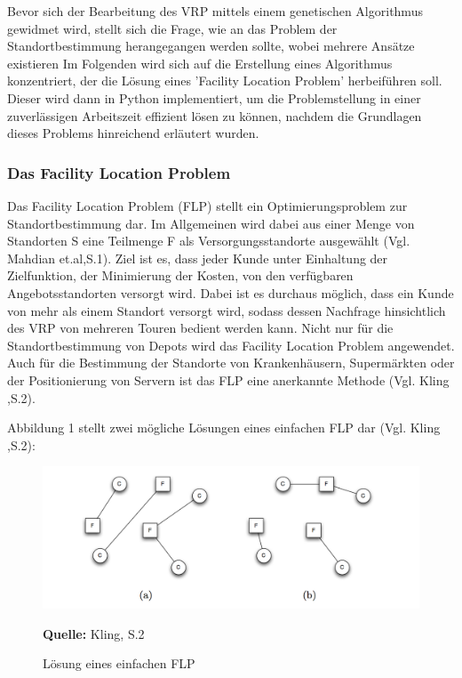\documentclass[a4paper,12pt,parskip,bibtotoc,liststotoc]{article}
\begin{document}
Bevor sich der Bearbeitung des VRP mittels einem genetischen Algorithmus gewidmet wird, stellt sich die Frage, wie an das Problem der Standortbestimmung herangegangen werden sollte, wobei mehrere Ansätze existieren
Im Folgenden wird sich auf die Erstellung eines Algorithmus konzentriert, der die Lösung eines 'Facility Location Problem' herbeiführen soll.
Dieser wird dann in Python implementiert, um die Problemstellung in einer zuverlässigen Arbeitszeit effizient lösen zu können, nachdem die Grundlagen dieses Problems hinreichend erläutert wurden.


\subsubsection{Das Facility Location Problem}

Das Facility Location Problem (FLP) stellt ein Optimierungsproblem zur Standortbestimmung dar. Im Allgemeinen wird dabei aus einer Menge von Standorten S eine Teilmenge F als Versorgungsstandorte ausgewählt (Vgl. Mahdian et.al,S.1).
Ziel ist es, dass jeder Kunde unter Einhaltung der Zielfunktion, der Minimierung der Kosten, von den verfügbaren Angebotsstandorten versorgt wird.
Dabei ist es durchaus möglich, dass ein Kunde von mehr als einem Standort versorgt wird, sodass dessen Nachfrage hinsichtlich des VRP von mehreren Touren bedient werden kann.
Nicht nur für die Standortbestimmung von Depots wird das Facility Location Problem angewendet. 
Auch für die Bestimmung der Standorte von Krankenhäusern, Supermärkten oder der Positionierung von Servern ist das FLP eine anerkannte Methode (Vgl. Kling ,S.2).

Abbildung 1 stellt zwei mögliche Lösungen eines einfachen FLP dar (Vgl. Kling ,S.2):

\begin{figure}[h!]
  \begin{center}
    \includegraphics[width=150mm]{FLP}
    \caption{Lösung eines einfachen FLP}  \label{Typen}
    {\footnotesize \textbf{Quelle:} Kling, S.2 }
  \end{center}
\end{figure}
\end{document}

